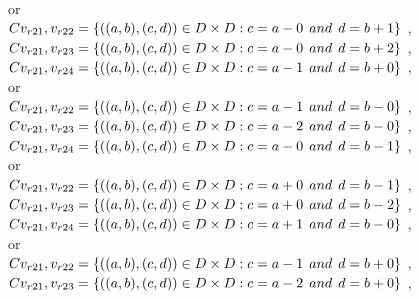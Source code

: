 \\or
\\$C{v_{r21},v_{r22}}=\{((a,b),(c,d))\in D\times D: c = a - 0\hspace{1ex} and \hspace{1ex}  d = b + 1 \}$ , 
\\$C{v_{r21},v_{r23}}=\{((a,b),(c,d))\in D\times D: c = a - 0\hspace{1ex} and \hspace{1ex}  d = b + 2 \}$ , 
\\$C{v_{r21},v_{r24}}=\{((a,b),(c,d))\in D\times D: c = a - 1\hspace{1ex} and \hspace{1ex}  d = b + 0 \}$ , 
\\or
\\$C{v_{r21},v_{r22}}=\{((a,b),(c,d))\in D\times D: c = a - 1\hspace{1ex} and \hspace{1ex}  d = b - 0 \}$ , 
\\$C{v_{r21},v_{r23}}=\{((a,b),(c,d))\in D\times D: c = a - 2\hspace{1ex} and \hspace{1ex}  d = b - 0 \}$ , 
\\$C{v_{r21},v_{r24}}=\{((a,b),(c,d))\in D\times D: c = a - 0\hspace{1ex} and \hspace{1ex}  d = b - 1 \}$ , 
\\or
\\$C{v_{r21},v_{r22}}=\{((a,b),(c,d))\in D\times D: c = a + 0\hspace{1ex} and \hspace{1ex}  d = b - 1 \}$ , 
\\$C{v_{r21},v_{r23}}=\{((a,b),(c,d))\in D\times D: c = a + 0\hspace{1ex} and \hspace{1ex}  d = b - 2 \}$ , 
\\$C{v_{r21},v_{r24}}=\{((a,b),(c,d))\in D\times D: c = a + 1\hspace{1ex} and \hspace{1ex}  d = b - 0 \}$ , 
\\or
\\$C{v_{r21},v_{r22}}=\{((a,b),(c,d))\in D\times D: c = a - 1\hspace{1ex} and \hspace{1ex}  d = b + 0 \}$ , 
\\$C{v_{r21},v_{r23}}=\{((a,b),(c,d))\in D\times D: c = a - 2\hspace{1ex} and \hspace{1ex}  d = b + 0 \}$ , 
